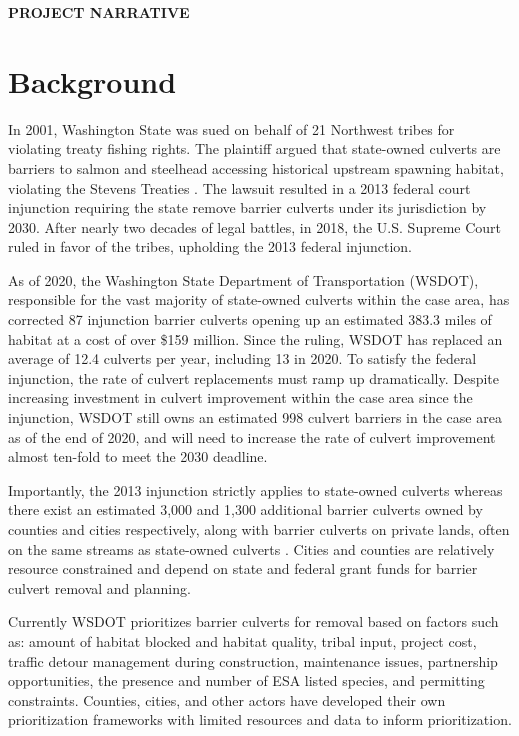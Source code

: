 \documentclass[12pt]{elsarticle}
\begin{document}
\begin{center} \textbf{PROJECT NARRATIVE} \end{center}


\section{Background} 
 In 2001, Washington State was sued on behalf of 21 Northwest tribes for violating treaty fishing rights. The plaintiff argued that state-owned culverts are barriers to salmon and steelhead accessing historical upstream spawning habitat, violating the Stevens Treaties \citep{hickey2018highway}. The lawsuit resulted in a 2013 federal court injunction requiring the state remove barrier culverts under its jurisdiction by 2030. After nearly two decades of legal battles, in 2018, the U.S. Supreme Court ruled in favor of the tribes, upholding the 2013 federal injunction. 

As of 2020, the Washington State Department of Transportation (WSDOT), responsible for the vast majority of state-owned culverts within the case area, has corrected 87 injunction barrier culverts opening up an estimated 383.3 miles of habitat at a cost of over \$159 million. Since the ruling, WSDOT has replaced an average of 12.4 culverts per year, including 13 in 2020. To satisfy the federal injunction, the rate of culvert replacements must ramp up dramatically. Despite increasing investment in culvert improvement within the case area since the injunction, WSDOT still owns an estimated 998 culvert barriers in the case area as of the end of 2020, and will need to increase the rate of culvert improvement almost ten-fold to meet the 2030 deadline.  

Importantly, the 2013 injunction strictly applies to state-owned culverts whereas there exist an estimated 3,000 and 1,300 additional barrier culverts owned by counties and cities respectively, along with barrier culverts on private lands, often on the same streams as state-owned culverts \citep{brown2019coming}. Cities and counties are relatively resource constrained and depend on state and federal grant funds for barrier culvert removal and planning.

Currently WSDOT prioritizes barrier culverts for removal based on factors such as: amount of habitat blocked and habitat quality, tribal input, project cost, traffic detour management during construction, maintenance issues, partnership opportunities, the presence and number of ESA listed species, and permitting constraints. Counties, cities, and other actors have developed their own prioritization frameworks with limited resources and data to inform prioritization. 
\end{document}
